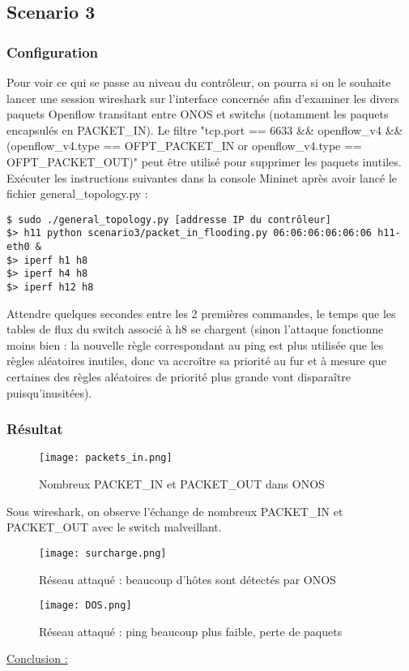 \subsection{Scenario 3}

\subsubsection{Configuration}

Pour voir ce qui se passe au niveau du contrôleur, on pourra si on le souhaite lancer une session wireshark sur l'interface concernée afin d'examiner les divers paquets Openflow transitant entre ONOS et switchs (notamment les paquets encapsulés en PACKET\_IN). Le filtre "tcp.port == 6633 \&\& openflow\_v4 \&\& (openflow\_v4.type == OFPT\_PACKET\_IN or openflow\_v4.type == OFPT\_PACKET\_OUT)" peut être utilisé pour supprimer les paquets inutiles.
Exécuter les instructions suivantes dans la console Mininet après avoir lancé le fichier general\_topology.py :

\begin{verbatim}
$ sudo ./general_topology.py [addresse IP du contrôleur]
$> h11 python scenario3/packet_in_flooding.py 06:06:06:06:06:06 h11-eth0 &
$> iperf h1 h8
$> iperf h4 h8
$> iperf h12 h8
\end{verbatim}

Attendre quelques secondes entre les 2 premières commandes, le temps que les tables de flux du switch associé à h8 se chargent (sinon l'attaque fonctionne moins bien : la nouvelle règle correspondant au ping est plus utilisée que les règles aléatoires inutiles, donc va accroître sa priorité au fur et à mesure que certaines des règles aléatoires de priorité plus grande vont disparaître puisqu'inusitées).


\subsubsection{Résultat}

\begin{figure}[h]
  	\centering
  	\texttt{[image: packets\_in.png]}
  	\caption{Nombreux PACKET\_IN et PACKET\_OUT dans ONOS}
\end{figure}

Sous wireshark, on observe l'échange de nombreux PACKET\_IN et PACKET\_OUT avec le switch malveillant.

\begin{figure}[h]
  	\centering
  	\texttt{[image: surcharge.png]}
  	\caption{Réseau attaqué : beaucoup d'hôtes sont détectés par ONOS}
\end{figure}

\begin{figure}[h]
  	\centering
  	\texttt{[image: DOS.png]}
  	\caption{Réseau attaqué : ping beaucoup plus faible, perte de paquets}
\end{figure}

\underline{Conclusion :}\\
